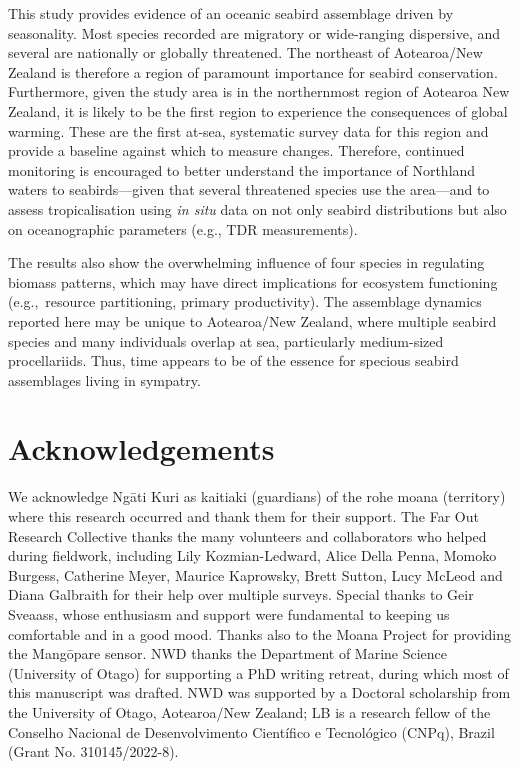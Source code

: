 \documentclass[preprint, 3p, authoryear]{elsarticle} %
\begin{document}
This study provides evidence of an oceanic seabird assemblage driven by seasonality. Most species recorded are migratory or wide-ranging dispersive, and several are nationally or globally threatened. The northeast of Aotearoa/New Zealand is therefore a region of paramount importance for seabird conservation. Furthermore, given the study area is in the northernmost region of Aotearoa New Zealand, it is likely to be the first region to experience the consequences of global warming. These are the first at-sea, systematic survey data for this region and provide a baseline against which to measure changes. Therefore, continued monitoring is encouraged to better understand the importance of Northland waters to seabirds---given that several threatened species use the area---and to assess tropicalisation using \emph{in situ} data on not only seabird distributions but also on oceanographic parameters (e.g., TDR measurements).

The results also show the overwhelming influence of four species in regulating biomass patterns, which may have direct implications for ecosystem functioning (e.g.,~resource partitioning, primary productivity). The assemblage dynamics reported here may be unique to Aotearoa/New Zealand, where multiple seabird species and many individuals overlap at sea, particularly medium-sized procellariids. Thus, time appears to be of the essence for specious seabird assemblages living in sympatry.

\hypertarget{acknowledgements}{%
\section*{Acknowledgements}\label{acknowledgements}}

We acknowledge Ng\={a}ti Kuri as kaitiaki (guardians) of the rohe moana (territory) where this research occurred and thank them for their support. The Far Out Research Collective thanks the many volunteers and collaborators who helped during fieldwork, including Lily Kozmian-Ledward, Alice Della Penna, Momoko Burgess, Catherine Meyer, Maurice Kaprowsky, Brett Sutton, Lucy McLeod and Diana Galbraith for their help over multiple surveys. Special thanks to Geir Sveaass, whose enthusiasm and support were fundamental to keeping us comfortable and in a good mood. Thanks also to the Moana Project for providing the Mang\={o}pare sensor. NWD thanks the Department of Marine Science (University of Otago) for supporting a PhD writing retreat, during which most of this manuscript was drafted. NWD was supported by a Doctoral scholarship from the University of Otago, Aotearoa/New Zealand; LB is a research fellow of the Conselho Nacional de Desenvolvimento Científico e Tecnológico (CNPq), Brazil (Grant No. 310145/2022-8).
\end{document}
